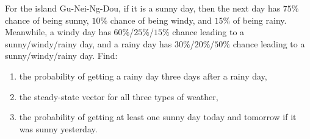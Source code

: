 \begin{Exercise}
For the island Gu-Nei-Ng-Dou, if it is a sunny day, then the next day has $75\%$ chance of being sunny, $10\%$ chance of being windy, and $15\%$ of being rainy. Meanwhile, a windy day has $60\%$/$25\%$/$15\%$ chance leading to a sunny/windy/rainy day, and a rainy day has $30\%$/$20\%$/$50\%$ chance leading to a sunny/windy/rainy day. Find:
\begin{enumerate}[label=(\alph*)]
\item the probability of getting a rainy day three days after a rainy day,
\item the steady-state vector for all three types of weather,
\item the probability of getting at least one sunny day today and tomorrow if it was sunny yesterday.
\end{enumerate}
\end{Exercise}

